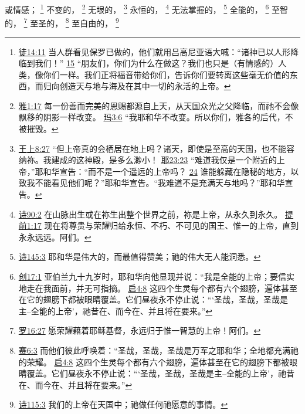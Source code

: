 \documentclass[12pt, a4paper, oneside]{ctexart}
\begin{document}
	或情感；
	\footnote {
		\href{https://biblehub.com/acts/14-11.htm}{徒14:11} 当人群看见保罗已做的，他们就用吕高尼亚语大喊：“诸神已以人形降临到我们！”
		\href{https://biblehub.com/acts/14-15.htm}{15} “朋友们，你们为什么在做这？我们也只是（有情感的）人类，像你们一样。我们正将福音带给你们，告诉你们要转离这些毫无价值的东西，而归向创造天与地与海及在其中一切的永活的上帝。
	}
	不变的，
	\footnote {
		\href{https://biblehub.com/james/1-17.htm}{雅1:17} 每一份善而完美的恩赐都源自上天，从天国众光之父降临，而祂不会像飘移的阴影一样改变。
		\href{https://biblehub.com/malachi/3-6.htm}{玛3:6} “我耶和华不改变。所以你们，雅各的后代，不被摧毁。
	}
	无垠的，
	\footnote {
		\href{https://biblehub.com/1_kings/8-27.htm}{王上8:27} “但上帝真的会栖居在地上吗？诸天，即使是至高的天国，也不能容纳祢。我建成的这神殿，是多么渺小！
		\href{https://biblehub.com/jeremiah/23-23.htm}{耶23:23} “难道我仅是一个附近的上帝，”耶和华宣告：“而不是一个遥远的上帝吗？
		\href{https://biblehub.com/jeremiah/23-24.htm}{24} 谁能躲藏在隐秘的地方，以致我不能看见他们呢？”耶和华宣告。“我难道不是充满天与地吗？”耶和华宣告。
	}
	永恒的，
	\footnote {
		\href{https://biblehub.com/psalms/90-2.htm}{诗90:2} 在山脉出生或在祢生出整个世界之前，祢是上帝，从永久到永久。
		\href{https://biblehub.com/1_timothy/1-17.htm}{提前1:17} 现在将尊贵与荣耀归给永恒、不朽、不可见的国王、惟一的上帝，直到永永远远。阿们。
	}
	无法掌握的，
	\footnote {
		\href{https://biblehub.com/psalms/145-3.htm}{诗145:3} 耶和华是伟大的，而最值得赞美；祂的伟大无人能洞悉。
	}
	全能的，
	\footnote {
		\href{https://biblehub.com/genesis/17-1.htm}{创17:1} 亚伯兰九十九岁时，耶和华向他显现并说：“我是全能的上帝；要信实地走在我面前，并无可指摘。
		\href{https://biblehub.com/revelation/4-8.htm}{启4:8} 这四个生灵每个都有六个翅膀，遍体甚至在它的翅膀下都被眼睛覆盖。它们昼夜永不停止说：“‘圣哉，圣哉，圣哉是主--全能的上帝’，祂昔在、而今在、并且将在要来。”
	}
	至智的，
	\footnote {
		\href{https://biblehub.com/romans/16-27.htm}{罗16:27} 愿荣耀藉着耶稣基督，永远归于惟一智慧的上帝！阿们。
	}
	至圣的，
	\footnote {
		\href{https://biblehub.com/isaiah/6-3.htm}{赛6:3} 而他们彼此呼唤着：“圣哉，圣哉，圣哉是万军之耶和华；全地都充满祂的荣耀。
		\href{https://biblehub.com/revelation/4-8.htm}{启4:8} 这四个生灵每个都有六个翅膀，遍体甚至在它的翅膀下都被眼睛覆盖。它们昼夜永不停止说：“‘圣哉，圣哉，圣哉是主--全能的上帝’，祂昔在、而今在、并且将在要来。”
	}
	至自由的，
	\footnote {
		\href{https://biblehub.com/psalms/115-3.htm}{诗115:3} 我们的上帝在天国中；祂做任何祂愿意的事情。
	}
\end{document}
